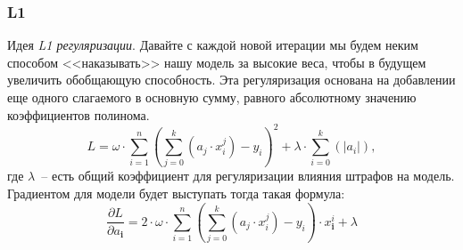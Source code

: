 \documentclass[12pt, a4paper, oneside, final]{article}
\begin{document}
	\subsubsection*{L1}
	Идея \textit{L1 регуляризации}.
	Давайте с каждой новой итерации мы будем неким способом <<наказывать>> нашу модель за высокие веса, чтобы в будущем увеличить обобщающую способность.
	Эта регуляризация основана на добавлении еще одного слагаемого в основную сумму, равного абсолютному значению коэффициентов полинома.
	\[
		L = \omega\cdot\sum\limits_{i = 1}^{n}{\left(\sum\limits_{j = 0}^{k}{\left(a_{j} \cdot x^{j}_{i}\right)} - y_{i}\right)^{2}} + \lambda \cdot \sum\limits_{i = 0}^{k}{\left(|a_{i}|\right)},
	\]
	где $\lambda$~-- есть общий коэффициент для регуляризации влияния штрафов на модель.
	Градиентом для модели будет выступать тогда такая формула:
	\[
		\dfrac{\partial{L}}{\partial{a_{\mathbf{i}}}} = 2\cdot\omega\cdot\sum\limits_{i = 1}^{n}{\left(\sum\limits_{j = 0}^{k}{\left(a_{j} \cdot x_{i}^{j}\right)} - y_{i}\right) \cdot x^{i}_{\mathbf{i}}} + \lambda
	\]
\end{document}
